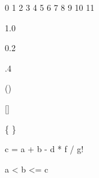   0 1 2 3 4 5 6 7 8 9 10 11

  1.0

  0.2

  .4

  ()

  []

  \{ \}

  c = a + b - d * f / g!

  a < b <= c

